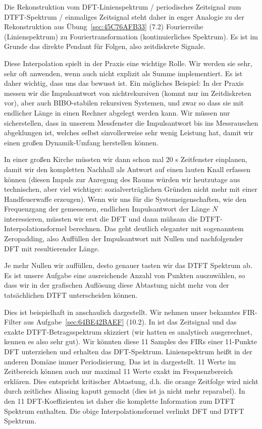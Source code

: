 \begin{Loesung}
Die Rekonstruktion 
vom DFT-Linienspektrum / periodisches Zeitsignal zum
DTFT-Spektrum / einmaliges Zeitsignal steht daher in enger Analogie zu der
Rekonstruktion aus Übung~\ref{sec:45C76AFB33} (7.2) Fourierreihe (Linienspektrum) zu
Fouriertransformation (kontinuierliches Spektrum). Es ist im Grunde das
direkte Pendant für Folgen, also zeitdiskrete Signale.

Diese Interpolation spielt in der Praxis eine wichtige Rolle. Wir werden sie
sehr, sehr oft anwenden, wenn auch nicht explizit als Summe implementiert.
Es ist daher wichtig, dass uns das bewusst ist.
Ein mögliches Beispiel:
In der Praxis messen wir
die Impulsantwort von nichtrekursiven (kommt nur im Zeitdiskreten
vor), aber auch BIBO-stabilen rekursiven Systemen,
und zwar so dass sie mit endlicher Länge in einen Rechner abgelegt werden kann.
%
Wir müssen nur sicherstellen, dass
in unserem Messfenster die Impulsantwort
bis ins Messrauschen abgeklungen ist, welches selbst sinvollerweise sehr wenig
Leistung hat, damit wir einen großen Dynamik-Umfang herstellen können.

In einer großen Kirche müssten wir dann schon mal 20 s Zeitfenster einplanen,
damit wir den kompletten Nachhall als Antwort auf einen lauten Knall erfassen
können (diesen Impuls zur Anregung des Raums würden wir heutzutage aus technischen,
aber viel wichtiger: sozialverträglichen Gründen nicht mehr mit einer Handfeuerwaffe
erzeugen).
%
Wenn wir uns für die Systemeigenschaften, wie den Frequenzgang der gemessenen,
endlichen Impulsantwort der Länge $N$ interessieren, müssten wir erst die
DFT und dann mühsam die DTFT-Interpolationsformel berechnen. Das geht deutlich
eleganter mit sogenanntem Zeropadding, also Auffüllen der Impulsantwort mit
Nullen und nachfolgender DFT mit resultierender Länge.

Je mehr Nullen wir auffüllen, desto genauer tasten wir das DTFT Spektrum ab.
Es ist unsere Aufgabe eine ausreichende Anzahl von Punkten auszuwählen,
so dass wir in der grafischen Auflösung diese Abtastung nicht mehr
von der tatsächlichen DTFT unterscheiden können.

Dies ist beispielhaft in  anschaulich dargestellt.
Wir nehmen unser bekanntes FIR-Filter aus Aufgabe~\ref{sec:64BE42BAEF} (10.2).
In  ist das Zeitsignal und das exakte DTFT-Betragsspektrum
skizziert (wir hatten es analytisch ausgerechnet, kennen es also sehr gut).
%
Wir könnten diese 11 Samples des FIRs einer 11-Punkte DFT unterziehen und erhalten
das DFT-Spektrum. Linienspektrum heißt in der anderen Domäne immer Periodisierung.
Das ist in  dargestellt. 11 Werte im Zeitbereich
können auch nur maximal 11 Werte exakt im Frequenzbereich erklären. Dies
entspricht kritischer Abtastung, d.h. die orange Zeitfolge wird nicht durch
zeitliches Aliasing kaputt gemacht (dies ist ja nicht mehr reparabel).
In den 11 DFT-Koeffizienten ist daher die komplette Information zum DTFT
Spektrum enthalten. Die obige Interpolationsformel  
verlinkt DFT und DTFT Spektrum.


\end{Loesung}
